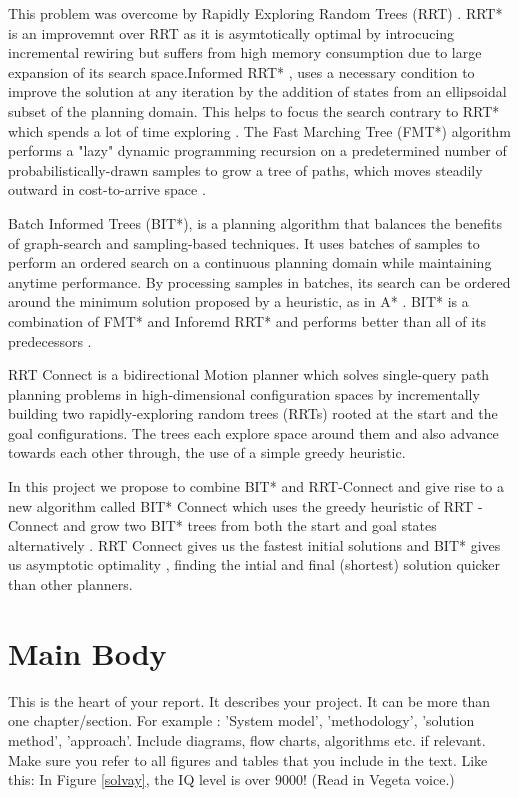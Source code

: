 \documentclass[12pt]{report}
\begin{document}
This problem was overcome by Rapidly Exploring Random Trees (RRT) . RRT* is an improvemnt over RRT as it is asymtotically optimal by introcucing incremental rewiring\cite{6942976} but suffers from high memory consumption due to large expansion of its search space.\cite{noreen2016optimal}Informed RRT* , uses a necessary condition to improve the solution at any iteration by the addition of states from an ellipsoidal subset of the planning domain. \cite{6942976} This helps to focus the search contrary to RRT* which spends a lot of time exploring . The Fast Marching Tree (FMT*) algorithm performs a "lazy" dynamic programming recursion on a predetermined number of probabilistically-drawn samples to grow a tree of paths, which moves steadily outward in cost-to-arrive space \cite{janson2015fast}.

Batch Informed Trees (BIT*), is a planning algorithm that balances the benefits of graph-search and sampling-based techniques. It uses batches of samples to perform an ordered search on a continuous planning domain while maintaining anytime performance. By processing samples in batches, its search can be ordered around the minimum solution proposed by a heuristic, as in A* \cite{7139620}. BIT* is a combination of FMT* and Inforemd RRT* and performs better than all of its predecessors . 

RRT Connect is a bidirectional Motion planner which solves single-query path planning problems in high-dimensional configuration spaces by incrementally building two rapidly-exploring random trees (RRTs) rooted at the start and the goal configurations. The trees each explore space around them and also advance towards each other through, the use of a simple greedy heuristic\cite{844730}.

In this project we propose to combine BIT* and RRT-Connect and give rise to a new algorithm called BIT* Connect which uses the greedy heuristic of RRT - Connect and grow two BIT* trees from both the start and goal states alternatively . RRT Connect gives us the fastest initial solutions and BIT* gives us asymptotic optimality , finding the intial and final (shortest) solution quicker than other planners.









\chapter{Main Body}
This is the heart of your report. It describes your project. It can be more than one chapter/section. For example : 'System model', 'methodology', 'solution method', 'approach'. Include diagrams, flow charts, algorithms etc. if relevant. Make sure you refer to all figures and tables that you include in the text. Like this: In Figure \ref{solvay}, the IQ level is over 9000! (Read in Vegeta voice.)
\end{document}
